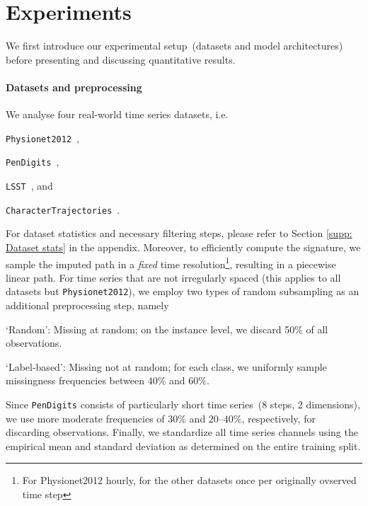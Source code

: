 \documentclass{article}
\begin{document}


\section{Experiments}

We first introduce our experimental setup~(datasets and model
architectures) before presenting and discussing quantitative results.

\paragraph{Datasets and preprocessing}

We analyse four real-world time series datasets, i.e.\
%
\begin{inparaenum}[(i)]
  \item \texttt{Physionet2012}~\citep{goldberger2000physiobank},
  \item \texttt{PenDigits}~\citep{Dua2019},
  \item \texttt{LSST}~\citep{allam2018photometric}, and
  \item \texttt{CharacterTrajectories}~\citep{Dua2019}.
\end{inparaenum}
%
For dataset statistics and necessary filtering steps, please refer to Section \ref{supp: Dataset stats} in the appendix.
Moreover, to efficiently compute the signature, we
sample the imputed path in a \emph{fixed} time resolution\footnote{For Physionet2012 hourly, for the other datasets once per originally ovserved time step}, resulting in
a piecewise linear path.
%
For time series that are not irregularly spaced (this applies to all datasets but \texttt{Physionet2012}), we employ two types of random subsampling as an additional
preprocessing step,
namely
%
\begin{inparaenum}[(1)]
    \item `Random': Missing at random; on the instance level, we discard 50\% of all observations.
    \item `Label-based': Missing not at random; for each
      class, we uniformly sample missingness frequencies between $40\%$
      and $60\%$.
\end{inparaenum}
%
Since \texttt{PenDigits} consists of particularly short time series~(8
steps, 2 dimensions), we use more moderate frequencies of $30\%$
and $20$--$40\%$, respectively, for discarding observations.
Finally, we standardize all time series channels using the empirical mean and standard deviation as determined on the entire training split.
\end{document}
